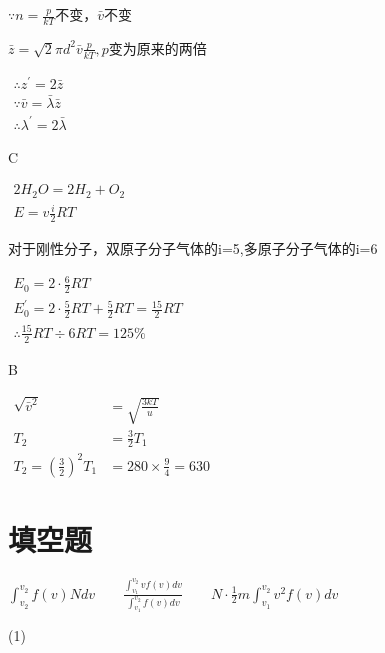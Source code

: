 \documentclass[b5paper,opensource]{./template/qyxf-book}
\begin{document}
$
\because n = \frac { p } { k T }
$不变，$ \bar { v }$不变

$
\bar { z } = \sqrt { 2 } \pi d ^ { 2 } \bar { v } \frac { p } { k T },p
$变为原来的两倍

$
\begin{array} { l } { \therefore z ^ { \prime } = 2 \bar { z } } \\ { \because \bar { v } = \bar { \lambda } \bar { z } } \\ { \therefore \lambda ^ { \prime } = 2 \bar { \lambda } } \end{array}
$

C

\solve

$
\begin{array} { l } { 2 H _ { 2 } O = 2 H _ { 2 } + O _ { 2 } } \\ { E = v \frac { i } { 2 } R T } \end{array}
$

对于刚性分子，双原子分子气体的i=5,多原子分子气体的i=6

$
\begin{array} { l } E _ { 0 } = 2 \cdot \frac { 6 } { 2 } R T \\ E _ { 0 } ^ { \prime } = 2 \cdot \frac { 5 } { 2 } R T + \frac { 5 } { 2 } R T = \frac { 15 } { 2 } R T \\ \therefore \frac { 15 } { 2 } R T \div 6 R T = 125 \% \end{array}
$

B

\solve

$
\begin{aligned} \sqrt { \bar { v } ^ { 2 } } & = \sqrt { \frac { 3 k T } { u } } \\ T _ { 2 } & = \frac { 3 } { 2 } T _ { 1 } \\ T _ { 2 } = \left( \frac { 3 } { 2 } \right) ^ { 2 } T _ { 1 } & = 280 \times \frac { 9 } { 4 } = 630 \end{aligned}
$
\section{填空题}
$
\int _ { v _ { 2 } } ^ { v _ { 2 } } f ( v ) N d v
\qquad
\frac { \int _ { v _ { 1 } } ^ { v _ { 2 } } v f ( v ) d v } { \int _ { v _ { 1 } } ^ { v _ { 2 } } f ( v ) d v }
\qquad
N \cdot \frac { 1 } { 2 } m \int _ { v _ { 1 } } ^ { v _ { 2 } } v ^ { 2 } f ( v ) d v
$

\solve
(1)
\end{document}

